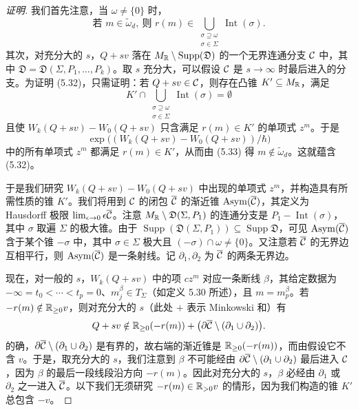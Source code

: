 \begin{proof}[证明]
我们首先注意，当 $\omega\ne\{0\}$ 时，
\begin{equation}
  \text{若 } m\in\tilde\omega_d,\ \text{则 } r(m)\in\bigcup_{\substack{\sigma\supseteq\omega\\ \sigma\in\Sigma}}\operatorname{Int}(\sigma). \tag{5.33}
\end{equation}
其次，对充分大的 $s$，$Q+sv$ 落在 $M_{\mathbb{R}}\setminus\operatorname{Supp}(\mathfrak{D})$ 的一个无界连通分支 $\mathcal{C}$ 中，其中 $\mathfrak{D}=\mathfrak{D}(\Sigma,P_1,\ldots,P_k)$。取 $s$ 充分大，可以假设 $\mathcal{C}$ 是 $s\to\infty$ 时最后进入的分支。为证明 (5.32)，只需证明：若 $Q+sv\in\mathcal{C}$，则存在凸锥 $K'\subseteq M_{\mathbb{R}}$，满足
\[
  K'\cap\bigcup_{\substack{\sigma\supseteq\omega\\ \sigma\in\Sigma}}\operatorname{Int}(\sigma)=\emptyset
\]
且使 $W_k(Q+sv)-W_0(Q+sv)$ 只含满足 $r(m)\in K'$ 的单项式 $z^m$。于是
\[
  \exp\bigl((W_k(Q+sv)-W_0(Q+sv))/\hbar\bigr)
\]
中的所有单项式 $z^m$ 都满足 $r(m)\in K'$，从而由 (5.33) 得 $m\notin\tilde\omega_d$。这就蕴含 (5.32)。

于是我们研究 $W_k(Q+sv)-W_0(Q+sv)$ 中出现的单项式 $z^m$，并构造具有所需性质的锥 $K'$。我们将用到 $\mathcal{C}$ 的闭包 $\overline{\mathcal{C}}$ 的渐近锥 $\operatorname{Asym}(\overline{\mathcal{C}})$，其定义为 Hausdorff 极限 $\lim_{\epsilon\to 0}\epsilon\overline{\mathcal{C}}$。注意 $M_{\mathbb{R}}\setminus\mathfrak{D}(\Sigma,P_1)$ 的连通分支是 $P_1-\operatorname{Int}(\sigma)$，其中 $\sigma$ 取遍 $\Sigma$ 的极大锥。由于 $\operatorname{Supp}(\mathfrak{D}(\Sigma,P_1))\subseteq\operatorname{Supp}\mathfrak{D}$，可见 $\operatorname{Asym}(\overline{\mathcal{C}})$ 含于某个锥 $-\sigma$ 中，其中 $\sigma\in\Sigma$ 极大且 $(-\sigma)\cap\omega\ne\{0\}$。又注意若 $\overline{\mathcal{C}}$ 的无界边互相平行，则 $\operatorname{Asym}(\overline{\mathcal{C}})$ 是一条射线。记 $\partial_1,\partial_2$ 为 $\overline{\mathcal{C}}$ 的两条无界边。

现在，对一般的 $s$，$W_k(Q+sv)$ 中的项 $cz^m$ 对应一条断线 $\beta$，其给定数据为 $-\infty=t_0<\cdots<t_p=0$、$m_j^\beta\in T_\Sigma$（如定义 5.30 所述），且 $m=m_p^\beta$。若 $-r(m)\notin\mathbb{R}_{\ge 0}v$，则对充分大的 $s$（此处 $+$ 表示 Minkowski 和）有
\[
  Q+sv\notin\mathbb{R}_{\ge 0}(-r(m))+\bigl(\partial\overline{\mathcal{C}}\setminus(\partial_1\cup\partial_2)\bigr).
\]
的确，$\partial\overline{\mathcal{C}}\setminus(\partial_1\cup\partial_2)$ 是有界的，故右端的渐近锥是 $\mathbb{R}_{\ge 0}(-r(m))$，而由假设它不含 $v$。于是，取充分大的 $s$，我们注意到 $\beta$ 不可能经由 $\partial\overline{\mathcal{C}}\setminus(\partial_1\cup\partial_2)$ 最后进入 $\mathcal{C}$，因为 $\beta$ 的最后一段线段沿方向 $-r(m)$。因此对充分大的 $s$，$\beta$ 必经由 $\partial_1$ 或 $\partial_2$ 之一进入 $\overline{\mathcal{C}}$。以下我们无须研究 $-r(m)\in\mathbb{R}_{>0}v$ 的情形，因为我们构造的锥 $K'$ 总包含 $-v$。


\end{proof}
